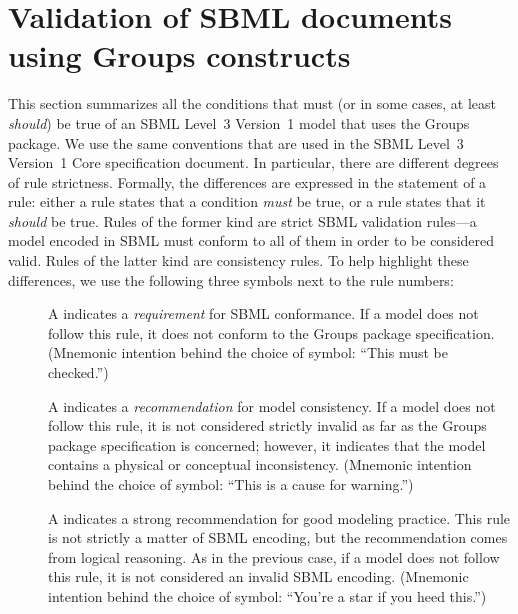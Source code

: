 
\section{Validation of SBML documents using Groups constructs}
\label{apdx-validation}
\label{validation-rules}

This section summarizes all the conditions that must (or in some cases, at least \emph{should}) be true of an SBML Level~3 Version~1 model that uses the Groups package.  We use the same conventions that are used in the SBML Level~3 Version~1 Core specification document.  In particular, there are different degrees of rule strictness.  Formally, the differences are expressed in the statement of a rule: either a rule states that a condition \emph{must} be true, or a rule states that it \emph{should} be true.  Rules of the former kind are strict SBML validation rules---a model encoded in SBML must conform to all of them in order to be considered valid.  Rules of the latter kind are consistency rules.  To help highlight these differences, we use the following three symbols next to the rule numbers:

\begin{description}

\item[\hspace*{6.5pt}\vSymbol\vsp] A \vSymbolName indicates a \emph{requirement} for SBML conformance. If a model does not follow this rule, it does not conform to the Groups package specification.  (Mnemonic intention behind the choice of symbol: ``This must be checked.'')

\item[\hspace*{6.5pt}\cSymbol\csp] A \cSymbolName indicates a \emph{recommendation} for model consistency.  If a model does not follow this rule, it is not considered strictly invalid as far as the Groups package specification is concerned; however, it indicates that the model contains a physical or conceptual inconsistency.  (Mnemonic intention behind the choice of symbol: ``This is a cause for warning.'')

\item[\hspace*{6.5pt}\mSymbol\msp] A \mSymbolName indicates a strong recommendation for good modeling practice.  This rule is not strictly a matter of SBML encoding, but the recommendation comes from logical reasoning.  As in the previous case, if a model does not follow this rule, it is not considered an invalid SBML encoding.  (Mnemonic intention behind the choice of symbol: ``You're a star if you heed this.'')

\end{description}

